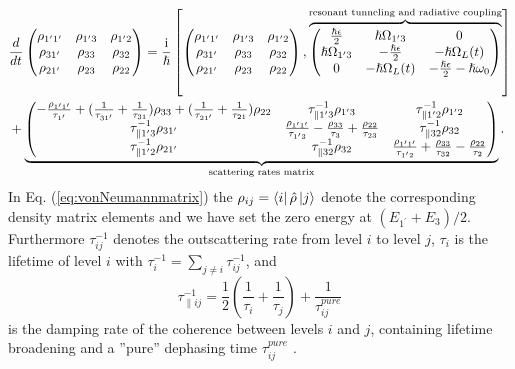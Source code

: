 \documentclass[10pt]{article}
\begin{document}
	\begin{align}
		&  \frac{d}{dt}%
		\begin{pmatrix}
			\rho_{1^{\prime}1^{\prime}} & \rho_{1^{\prime}3} & \rho_{1^{\prime}2}\\
			\rho_{31^{\prime}} & \rho_{33} & \rho_{32}\\
			\rho_{21^{\prime}} & \rho_{23} & \rho_{22}%
		\end{pmatrix}
		=\frac{\mathrm{i}}{\hslash}\left[
		\begin{pmatrix}
			\rho_{1^{\prime}1^{\prime}} & \rho_{1^{\prime}3} & \rho_{1^{\prime}2}\\
			\rho_{31^{\prime}} & \rho_{33} & \rho_{32}\\
			\rho_{21^{\prime}} & \rho_{23} & \rho_{22}%
		\end{pmatrix}
		,\overbrace{%
			\begin{pmatrix}
				\frac{\hslash\epsilon}{2} & \hslash\Omega_{1^{\prime}3} & 0\\
				\hslash\Omega_{1^{\prime}3} & -\frac{\hslash\epsilon}{2} & -\hslash\Omega_{L}(t)\\
				0 & -\hslash\Omega_{L}(t) & -\frac{\hslash\epsilon}{2}-\hslash\omega_{0}%
			\end{pmatrix}
		}^{\text{resonant tunneling and radiative coupling}}\right] \nonumber\\
		&  +\underbrace{%
			\begin{pmatrix}
				-\frac{\rho_{1^{\prime}1^{\prime}}}{\tau_{1^{\prime}}}+(\frac{1}%
				{\tau_{31^{\prime}}}+\frac{1}{\tau_{31}})\rho_{33}+(\frac{1}{\tau_{21^{\prime
						}}}+\frac{1}{\tau_{21}})\rho_{22} & \tau_{\parallel1^{\prime}3}^{-1}%
						\rho_{1^{\prime}3} & \tau_{\parallel1^{\prime}2}^{-1}\rho_{1^{\prime}2}\\
						\tau_{\parallel1^{\prime}3}^{-1}\rho_{31^{\prime}} & \frac{\rho_{1^{\prime
								}1^{\prime}}}{\tau_{1^{\prime}3}}-\frac{\rho_{33}}{\tau_{3}}+\frac{\rho_{22}%
						}{\tau_{23}} & \tau_{\parallel32}^{-1}\rho_{32}\\
						\tau_{\parallel1^{\prime}2}^{-1}\rho_{21^{\prime}} & \tau_{\parallel32}%
						^{-1}\rho_{32} & \frac{\rho_{1^{\prime}1^{\prime}}}{\tau_{1^{\prime}2}}%
						+\frac{\rho_{33}}{\tau_{32}}-\frac{\rho_{22}}{\tau_{2}}%
					\end{pmatrix}
				}_{\text{scattering rates matrix}}. \label{eq:vonNeumannmatrix}%
			\end{align}
			In Eq. (\ref{eq:vonNeumannmatrix}) the $\rho_{ij}=\Bra{i}\hat{\rho}\Ket{j}$ denote the corresponding density
			matrix elements and we have set the zero energy at $(E_{1^{\prime}}+E_{3})/2$.
			Furthermore $\tau_{ij}^{-1}$ denotes the outscattering rate from level $i$ to
			level $j$, $\tau_{i}$ is the lifetime of level $i$ with $\tau_{i}^{-1}%
			=\sum_{j\neq i}\tau_{ij}^{-1}$, and
\begin{equation}
			\tau_{\parallel ij}^{-1}=\frac{1}{2}\left(  \frac{1}{\tau_{i}}+\frac{1}%
			{\tau_{j}}\right)  +\frac{1}{\tau_{ij}^{pure}}%
\end{equation}
		is the damping rate of the coherence between levels $i$ and $j$, containing
		lifetime broadening and a ''pure'' dephasing time $\tau_{ij}^{pure}$
		\cite{callebaut2005importance}.
		
\end{document}
